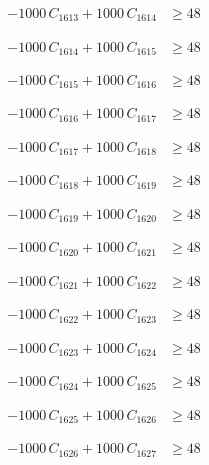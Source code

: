 \documentclass[a4paper,11pt]{article}
\begin{document}
\begin{align}
-1000\,C_{1613} + 1000\,C_{1614} &\geq 48 \nonumber
\end{align}

\begin{align}
-1000\,C_{1614} + 1000\,C_{1615} &\geq 48 \nonumber
\end{align}

\begin{align}
-1000\,C_{1615} + 1000\,C_{1616} &\geq 48 \nonumber
\end{align}

\begin{align}
-1000\,C_{1616} + 1000\,C_{1617} &\geq 48 \nonumber
\end{align}

\begin{align}
-1000\,C_{1617} + 1000\,C_{1618} &\geq 48 \nonumber
\end{align}

\begin{align}
-1000\,C_{1618} + 1000\,C_{1619} &\geq 48 \nonumber
\end{align}

\begin{align}
-1000\,C_{1619} + 1000\,C_{1620} &\geq 48 \nonumber
\end{align}

\begin{align}
-1000\,C_{1620} + 1000\,C_{1621} &\geq 48 \nonumber
\end{align}

\begin{align}
-1000\,C_{1621} + 1000\,C_{1622} &\geq 48 \nonumber
\end{align}

\begin{align}
-1000\,C_{1622} + 1000\,C_{1623} &\geq 48 \nonumber
\end{align}

\begin{align}
-1000\,C_{1623} + 1000\,C_{1624} &\geq 48 \nonumber
\end{align}

\begin{align}
-1000\,C_{1624} + 1000\,C_{1625} &\geq 48 \nonumber
\end{align}

\begin{align}
-1000\,C_{1625} + 1000\,C_{1626} &\geq 48 \nonumber
\end{align}

\begin{align}
-1000\,C_{1626} + 1000\,C_{1627} &\geq 48 \nonumber
\end{align}
\end{document}

